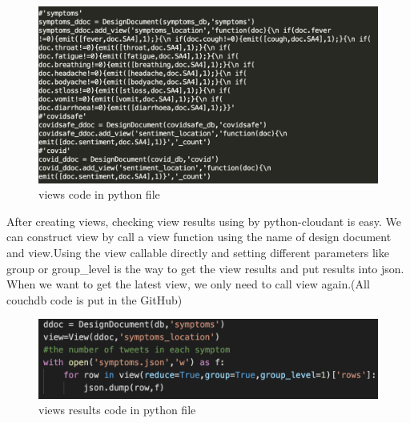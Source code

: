 \begin{figure}[H]
    \centering
    \includegraphics[scale=0.5]{city_analytics/report/images/view.png}
    \caption{views code in python file}
    \label{fig:my_label}
\end{figure}

After creating views, checking view results using by python-cloudant is easy. We can construct view by call a view function using the name of design document and view.Using the view callable directly and setting different parameters like group or group\_level is the way to get the view results and put results into json. When we want to get the latest view, we only need to call view again.(All couchdb code is put in the GitHub)

\begin{figure}[H]
    \centering
    \includegraphics[scale=0.5]{city_analytics/report/images/viewcode.png}
    \caption{views results code in python file}
    \label{fig:my_label}
\end{figure}